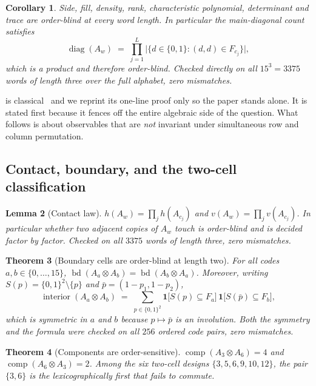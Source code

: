 \documentclass[11pt]{amsart}
\newtheorem{theorem}{Theorem}[section]
\newtheorem{lemma}[theorem]{Lemma}
\newtheorem{corollary}[theorem]{Corollary}
\theoremstyle{definition}
\theoremstyle{remark}
\begin{document}
\begin{corollary}
\label{cor:algebraic}
Side, fill, density, rank, characteristic polynomial, determinant and trace are order-blind at every word length. In particular the main-diagonal count satisfies
\[
  \operatorname{diag}(A_w) \;=\; \prod_{j=1}^{L} \bigl|\{d \in \{0,1\} : (d,d) \in F_{c_j}\}\bigr|,
\]
which is a product and therefore order-blind. Checked directly on all $15^3 = 3375$ words of length three over the full alphabet, zero mismatches.
\end{corollary}

 is classical~\cite{hendersonsearle,vanloan} and we reprint its one-line proof only so the paper stands alone. It is stated first because it fences off the entire algebraic side of the question. What follows is about observables that are \emph{not} invariant under simultaneous row and column permutation.

\subsection{Contact, boundary, and the two-cell classification}

\begin{lemma}[Contact law]
\label{lem:contact}
$h(A_w) = \prod_{j} h(A_{c_j})$ and $v(A_w) = \prod_{j} v(A_{c_j})$. In particular whether two adjacent copies of $A_w$ touch is order-blind and is decided factor by factor. Checked on all $3375$ words of length three, zero mismatches.
\end{lemma}

\begin{theorem}[Boundary cells are order-blind at length two]
\label{thm:boundary}
For all codes $a, b \in \{0,\dots,15\}$, $\operatorname{bd}(A_a \otimes A_b) = \operatorname{bd}(A_b \otimes A_a)$. Moreover, writing $S(p) = \{0,1\}^2 \setminus \{p\}$ and $\bar p = (1-p_1, 1-p_2)$,
\[
  \operatorname{interior}(A_a \otimes A_b) \;=\; \sum_{p \in \{0,1\}^2} \mathbf{1}\bigl[S(p) \subseteq F_a\bigr]\,\mathbf{1}\bigl[S(\bar p) \subseteq F_b\bigr],
\]
which is symmetric in $a$ and $b$ because $p \mapsto \bar p$ is an involution. Both the symmetry and the formula were checked on all $256$ ordered code pairs, zero mismatches.
\end{theorem}

\begin{theorem}[Components are order-sensitive]
\label{thm:witness}
$\operatorname{comp}(A_3 \otimes A_6) = 4$ and $\operatorname{comp}(A_6 \otimes A_3) = 2$. Among the six two-cell designs $\{3,5,6,9,10,12\}$, the pair $\{3,6\}$ is the lexicographically first that fails to commute.
\end{theorem}
\end{document}

